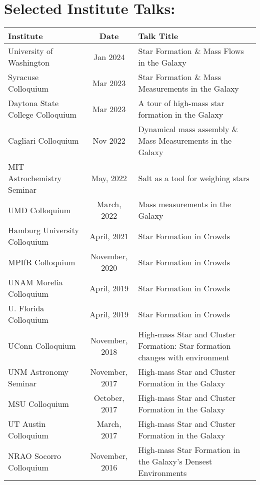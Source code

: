 
\begin{minipage}{\textwidth}
\setlength{\extrarowheight}{4pt}
\section*{Selected Institute Talks:}
\vspace{-12pt}
\begin{tabular}{p{1.8in}cp{3.5in}}
    Institute & Date & Talk Title \\
                \hline
    University of Washington & Jan 2024 & Star Formation \& Mass Flows in the Galaxy \\
    Syracuse Colloquium & Mar 2023 & Star Formation \& Mass Measurements in the Galaxy \\
    Daytona State College Colloquium & Mar 2023 & A tour of high-mass star formation in the Galaxy \\
    Cagliari Colloquium & Nov 2022 & Dynamical mass assembly \& Mass Measurements in the Galaxy \\
    MIT Astrochemistry Seminar & May, 2022 & Salt as a tool for weighing stars \\
    UMD Colloquium & March, 2022 & Mass measurements in the Galaxy \\
    Hamburg University Colloquium & April, 2021 & Star Formation in Crowds \\
    MPIfR Colloquium & November, 2020 & Star Formation in Crowds \\
    UNAM Morelia Colloquium & April, 2019 & Star Formation in Crowds \\
    U. Florida Colloquium & April, 2019 & Star Formation in Crowds \\
    UConn Colloquium & November, 2018 & High-mass Star and Cluster Formation: Star formation changes with environment \\
    UNM Astronomy Seminar & November, 2017 & High-mass Star and Cluster Formation in the Galaxy \\
    MSU Colloquium & October, 2017 & High-mass Star and Cluster Formation in the Galaxy \\
    UT Austin Colloquium & March, 2017 & High-mass Star and Cluster Formation in the Galaxy \\
    NRAO Socorro Colloquium & November, 2016 & High-mass Star Formation in the Galaxy's Densest Environments \\

\end{tabular}
\end{minipage}

